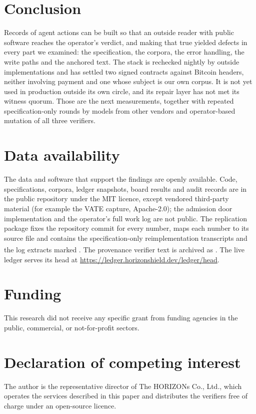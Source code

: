 \documentclass[preprint,12pt,authoryear]{elsarticle}
\newcommand{\priv}{\textsuperscript{\textdagger}}
\begin{document}
\section{Conclusion}

Records of agent actions can be built so that an outside reader with public software reaches the operator's verdict, and making that true yielded defects in every part we examined: the specification, the corpora, the error handling, the write paths and the anchored text. The stack is rechecked nightly by outside implementations and has settled two signed contracts against Bitcoin headers, neither involving payment and one whose subject is our own corpus. It is not yet used in production outside its own circle, and its repair layer has not met its witness quorum. Those are the next measurements, together with repeated specification-only rounds by models from other vendors and operator-based mutation of all three verifiers.

\section*{Data availability}
The data and software that support the findings are openly available. Code, specifications, corpora, ledger snapshots, board results and audit records are in the public repository \citep{repo} under the MIT licence, except vendored third-party material (for example the VATE capture, Apache-2.0); the admission door implementation and the operator's full work log are not public. The replication package \citep{replication} fixes the repository commit for every number, maps each number to its source file and contains the specification-only reimplementation transcripts and the log extracts marked \priv. The provenance verifier text is archived as \citet{zenodoverifier}. The live ledger serves its head at \url{https://ledger.horizonshield.dev/ledger/head}.

\section*{Funding}
This research did not receive any specific grant from funding agencies in the public, commercial, or not-for-profit sectors.

\section*{Declaration of competing interest}
The author is the representative director of The HORIZONs Co., Ltd., which operates the services described in this paper and distributes the verifiers free of charge under an open-source licence.
\end{document}
